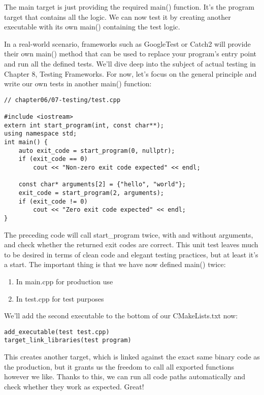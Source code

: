 The main target is just providing the required main() function. It's the program target that contains all the logic. We can now test it by creating another executable with its own main() containing the test logic.

In a real-world scenario, frameworks such as GoogleTest or Catch2 will provide their own main() method that can be used to replace your program's entry point and run all the defined tests. We'll dive deep into the subject of actual testing in Chapter 8, Testing Frameworks. For now, let's focus on the general principle and write our own tests in another main() function:

\begin{lstlisting}[style=styleCXX]
// chapter06/07-testing/test.cpp

#include <iostream>
extern int start_program(int, const char**);
using namespace std;
int main() {
	auto exit_code = start_program(0, nullptr);
	if (exit_code == 0)
		cout << "Non-zero exit code expected" << endl;
	
	const char* arguments[2] = {"hello", "world"};
	exit_code = start_program(2, arguments);
	if (exit_code != 0)
		cout << "Zero exit code expected" << endl;
}
\end{lstlisting}

The preceding code will call start\_program twice, with and without arguments, and check whether the returned exit codes are correct. This unit test leaves much to be desired in terms of clean code and elegant testing practices, but at least it's a start. The important thing is that we have now defined main() twice:

\begin{enumerate}
\item 
In main.cpp for production use

\item 
In test.cpp for test purposes
\end{enumerate}

We'll add the second executable to the bottom of our CMakeLists.txt now:

\begin{lstlisting}[style=styleCMake]
add_executable(test test.cpp)
target_link_libraries(test program)
\end{lstlisting}

This creates another target, which is linked against the exact same binary code as the production, but it grants us the freedom to call all exported functions however we like. Thanks to this, we can run all code paths automatically and check whether they work as expected. Great!













